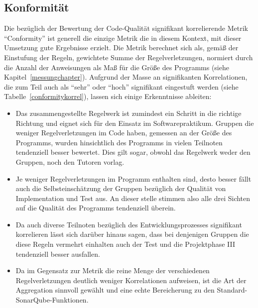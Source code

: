 \documentclass[da,ngerman]{stthesis}
\begin{document}
			\subsection{Konformität}  	
				Die bezüglich der Bewertung der Code-Qualität signifikant korrelierende Metrik "`Conformity"' ist generell die einzige Metrik die in diesem Kontext, mit dieser Umsetzung gute Ergebnisse erzielt. Die Metrik berechnet sich als, gemäß der Einstufung der Regeln, gewichtete Summe der Regelverletzungen, normiert durch die Anzahl der Anweisungen als Maß für die Größe des Programms (siehe Kapitel~\ref{messungchapter}).	Aufgrund der Masse an 	signifikanten Korrelationen, die zum Teil auch als "`sehr"' oder "`hoch"' signifikant eingestuft werden (siehe Tabelle~\ref{conformitykorrel}), lassen sich einige Erkenntnisse ableiten:
				\begin{itemize}
					\item Das zusammengestellte Regelwerk ist zumindest ein Schritt in die richtige Richtung und eignet sich für den Einsatz im Softwarepraktikum. Gruppen die weniger Regelverletzungen im Code haben, gemessen an der Größe des Programms, wurden hinsichtlich des Programms in vielen Teilnoten tendenziell besser bewertet. Dies gilt sogar, obwohl das Regelwerk weder den Gruppen, noch den Tutoren vorlag. 
					\item Je weniger Regelverletzungen im Programm enthalten sind, desto besser fällt auch die Selbsteinschätzung der Gruppen bezüglich der Qualität von Implementation und Test aus. An dieser stelle stimmen also alle drei Sichten auf die Qualität des Programms tendenziell überein.
					\item Da auch diverse Teilnoten bezüglich des Entwicklungsprozesses signifikant korrelieren lässt sich darüber hinaus sagen, dass bei denjenigen Gruppen die diese Regeln vermehrt einhalten auch der Test und die Projektphase III tendenziell besser ausfallen.
					\item Da im Gegensatz zur Metrik die reine Menge der verschiedenen Regelverletzungen deutlich weniger Korrelationen aufweisen, ist die Art der Aggregation sinnvoll gewählt und eine echte Bereicherung zu den Standard-SonarQube-Funktionen.
				\end{itemize}
\end{document}
